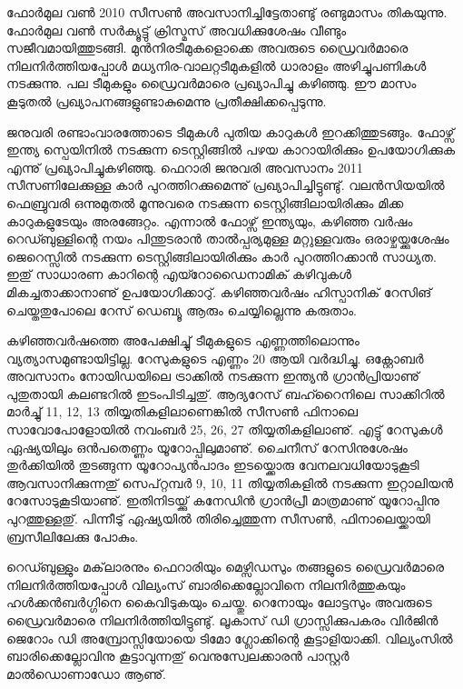 ﻿
\vskip 2pt

ഫോര്‍മുല വണ്‍ 2010 സീസണ്‍ അവസാനിച്ചിട്ടേതാണ്ടു് രണ്ടുമാസം തികയുന്നു. ഫോര്‍മുല വണ്‍ സര്‍ക്യൂട്ടു് 
ക്രിസ്മസ് അവധിക്കുശേഷം വീണ്ടും സജീവമായിത്തുടങ്ങി. മുന്‍നിരടീമുകളൊക്കെ അവരുടെ ഡ്രൈവര്‍മാരെ 
നിലനിര്‍ത്തിയപ്പോള്‍ മധ്യനിര-വാലറ്റടീമുകളില്‍ ധാരാളം അഴിച്ചുപണികള്‍ നടക്കുന്നു. പല ടീമുകളും ഡ്രൈവര്‍മാരെ 
പ്രഖ്യാപിച്ചു കഴിഞ്ഞു. ഈ മാസം കൂടുതല്‍ പ്രഖ്യാപനങ്ങളുണ്ടാകുമെന്നു പ്രതീക്ഷിക്കപ്പെടുന്നു.

ജനുവരി രണ്ടാംവാരത്തോടെ ടീമുകള്‍ പുതിയ കാറുകള്‍ ഇറക്കിത്തുടങ്ങും. ഫോഴ്സ് ഇന്ത്യ സ്പെയിനില്‍ നടക്കുന്ന 
ടെസ്റ്റിങ്ങില്‍ പഴയ കാറായിരിക്കും ഉപയോഗിക്കുക എന്നു് പ്രഖ്യാപിച്ചുകഴിഞ്ഞു. ഫെറാരി ജനുവരി അവസാനം 2011 
സീസണിലേക്കുള്ള കാര്‍ പുറത്തിറക്കുമെന്നു് പ്രഖ്യാപിച്ചിട്ടുണ്ടു്. വലന്‍സിയയില്‍ ഫെബ്രുവരി ഒന്നുമുതല്‍ മൂന്നുവരെ 
നടക്കുന്ന ടെസ്റ്റിങ്ങിലായിരിക്കും മിക്ക കാറുകളുടേയും അരങ്ങേറ്റം. എന്നാല്‍ ഫോഴ്സ് ഇന്ത്യയും, കഴിഞ്ഞ വര്‍ഷം 
റെഡ്ബുള്ളിന്റെ നയം പിന്തുടരാന്‍ താല്‍പ്പര്യമുള്ള മറ്റുള്ളവരും ഒരാഴ്ചയ്ക്കുശേഷം ജെറെസ്സില്‍ നടക്കുന്ന 
ടെസ്റ്റിങ്ങിലായിരിക്കും കാര്‍ പുറത്തിറക്കാന്‍ സാധ്യത. ഇതു് സാധാരണ കാറിന്റെ എയ്റോഡൈനാമിക് കഴിവുകള്‍ 
മികച്ചതാക്കാനാണു് ഉപയോഗിക്കാറു്. കഴിഞ്ഞവര്‍ഷം ഹിസ്പാനിക് റേസിങ് ചെയ്തതുപോലെ റേസ് ഡെബ്യൂ ആരും 
ചെയ്യില്ലെന്നു കരുതാം.

കഴിഞ്ഞവര്‍ഷത്തെ അപേക്ഷിച്ചു് ടീമുകളുടെ എണ്ണത്തിലൊന്നും വ്യത്യാസമുണ്ടായിട്ടില്ല. റേസുകളുടെ എണ്ണം 20 
ആയി വര്‍ദ്ധിച്ചു. ഒക്റ്റോബര്‍ അവസാനം നോയിഡയിലെ ട്രാക്കില്‍ നടക്കുന്ന ഇന്ത്യന്‍ ഗ്രാന്‍പ്രിയാണു് പുതുതായി 
കലണ്ടറില്‍ ഇടംപിടിച്ചതു്. ആദ്യറേസ് ബഹ്റൈനിലെ സാക്കിറില്‍ മാര്‍ച്ചു് 11, 12, 13 തിയ്യതികളിലാണെങ്കില്‍ 
സീസണ്‍ ഫിനാലെ സാവോപോളോയില്‍ നവംബര്‍ 25, 26, 27 തിയ്യതികളിലാണു്. എട്ടു് റേസുകള്‍ ഏഷ്യയിലും 
ഒന്‍പതെണ്ണം യൂറോപ്പിലുമാണു്. ചൈനീസ് റേസിനുശേഷം തുര്‍ക്കിയില്‍ തുടങ്ങുന്ന യൂറോപ്യന്‍പാദം ഇടയ്ക്കൊരു 
വേനലവധിയോടുകൂടി ആവസാനിക്കുന്നതു് സെപ്റ്റമ്പര്‍ 9, 10, 11 തിയ്യതികളില്‍ നടക്കുന്ന ഇറ്റാലിയന്‍ 
റേസോടുകൂടിയാണു്. ഇതിനിടയ്ക്കു് കനേഡിന്‍ ഗ്രാന്‍പ്രീ മാത്രമാണു് യൂറോപ്പിനു പുറത്തുള്ളതു്. പിന്നീടു് ഏഷ്യയില്‍ 
തിരിച്ചെത്തുന്ന സീസണ്‍, ഫിനാലെയ്ക്കായി ബ്രസീലിലേക്കു പോകും.

റെഡ്ബുള്ളും മക്‌ലാരനും ഫെറാരിയും മെഴ്സിഡസും തങ്ങളുടെ ഡ്രൈവര്‍മാരെ നിലനിര്‍ത്തിയപ്പോള്‍ വില്യംസ് 
ബാരിക്കെല്ലോവിനെ നിലനിര്‍ത്തുകയും ഹള്‍ക്കന്‍ബര്‍ഗ്ഗിനെ കൈവിടുകയും ചെയ്തു. റെനോയും ലോട്ടസും അവരുടെ 
ഡ്രൈവര്‍മാരെ നിലനിര്‍ത്തിയിട്ടുണ്ടു്. ലൂകാസ് ഡി ഗ്രാസ്സിക്കുപകരം വിര്‍ജിന്‍ ജെറോം ഡി അമ്പ്രോസ്സിയോയെ ടിമോ 
ഗ്ലോക്കിന്റെ കൂട്ടാളിയാക്കി. വില്യംസില്‍ ബാരിക്കെല്ലോവിനു കൂട്ടാവുന്നതു് വെനുസ്വേലക്കാരന്‍ പാസ്റ്റര്‍ 
മാല്‍ഡൊണാഡോ ആണു്.

